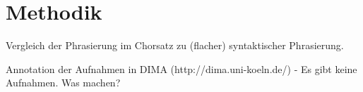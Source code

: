 \chapter{Methodik}
\label{chap:Methodik}
\pagestyle{plain}

Vergleich der Phrasierung im Chorsatz zu (flacher) syntaktischer Phrasierung.

Annotation der Aufnahmen in DIMA (http://dima.uni-koeln.de/) - Es gibt keine Aufnahmen. Was machen?